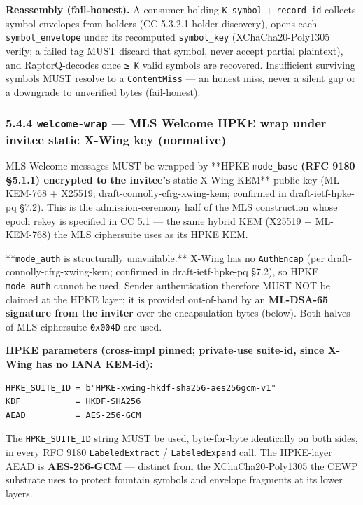 \documentclass[11pt]{article}
\begin{document}
\textbf{Reassembly (fail-honest).} A consumer holding \texttt{K\_symbol} + \texttt{record\_id} collects symbol envelopes from holders (CC 5.3.2.1 holder discovery), opens each \texttt{symbol\_envelope} under its recomputed \texttt{symbol\_key} (XChaCha20-Poly1305 verify; a failed tag MUST discard that symbol, never accept partial plaintext), and RaptorQ-decodes once \texttt{≥ K} valid symbols are recovered. Insufficient surviving symbols MUST resolve to a \texttt{ContentMiss} — an honest miss, never a silent gap or a downgrade to unverified bytes (fail-honest).


\subsubsection*{5.4.4 \texttt{welcome-wrap} — MLS Welcome HPKE wrap under invitee static X-Wing key (normative)}


MLS Welcome messages MUST be wrapped by **HPKE \texttt{mode\_base}\textbf{ (RFC 9180 §5.1.1) encrypted to the invitee's }static X-Wing KEM** public key (ML-KEM-768 + X25519; draft-connolly-cfrg-xwing-kem; confirmed in draft-ietf-hpke-pq §7.2). This is the admission-ceremony half of the MLS construction whose epoch rekey is specified in CC 5.1 — the same hybrid KEM (X25519 + ML-KEM-768) the MLS ciphersuite uses as its HPKE KEM.


**\texttt{mode\_auth} is structurally unavailable.** X-Wing has no \texttt{AuthEncap} (per draft-connolly-cfrg-xwing-kem; confirmed in draft-ietf-hpke-pq §7.2), so HPKE \texttt{mode\_auth} cannot be used. Sender authentication therefore MUST NOT be claimed at the HPKE layer; it is provided out-of-band by an \textbf{ML-DSA-65 signature from the inviter} over the encapsulation bytes (below). Both halves of MLS ciphersuite \texttt{0x004D} are used.


\textbf{HPKE parameters (cross-impl pinned; private-use suite-id, since X-Wing has no IANA KEM-id):}


\begin{lstlisting}
HPKE_SUITE_ID = b"HPKE-xwing-hkdf-sha256-aes256gcm-v1"
KDF           = HKDF-SHA256
AEAD          = AES-256-GCM
\end{lstlisting}

The \texttt{HPKE\_SUITE\_ID} string MUST be used, byte-for-byte identically on both sides, in every RFC 9180 \texttt{LabeledExtract} / \texttt{LabeledExpand} call. The HPKE-layer AEAD is \textbf{AES-256-GCM} — distinct from the XChaCha20-Poly1305 the CEWP substrate uses to protect fountain symbols and envelope fragments at its lower layers.
\end{document}
